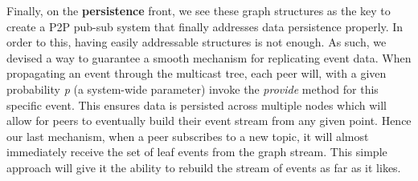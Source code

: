 Finally, on the \textbf{persistence} front, we see these graph
structures as the key to create a P2P pub-sub system that finally
addresses data persistence properly. In order to this, having easily
addressable structures is not enough. As such, we devised a way to
guarantee a smooth mechanism for replicating event data. When
propagating an event through the multicast tree, each peer will, with a
given probability \emph{p} (a system-wide parameter) invoke the
\emph{provide} method for this specific event. This ensures data is
persisted across multiple nodes which will allow for peers to eventually
build their event stream from any given point. Hence our last mechanism,
when a peer subscribes to a new topic, it will almost immediately
receive the set of leaf events from the graph stream. This simple
approach will give it the ability to rebuild the stream of events as
far as it likes.
